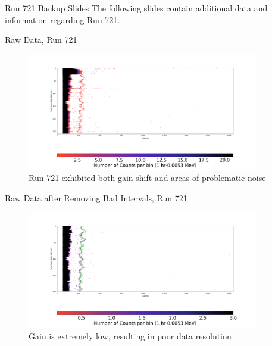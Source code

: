 \documentclass[aspectratio=169]{beamer}
\begin{document}
\begin{frame}{Run 721 Backup Slides}
\label{721_Backup}
    The following slides contain additional data and information regarding Run 721.
\end{frame}

\begin{frame}{Raw Data, Run 721}
    \begin{figure}
        \begin{center}
            \includegraphics[width=0.9\textwidth]
            {assets/721/RD.png}
            \caption{Run 721 exhibited both gain shift and areas of problematic noise}
        \end{center}
    \end{figure}
\end{frame}

\begin{frame}{Raw Data after Removing Bad Intervals, Run 721}
    \begin{figure}
        \begin{center}
            \includegraphics[width=0.9\textwidth]
            {assets/721/RDP.png}
            \caption{Gain is extremely low, resulting in poor data resolution}
        \end{center}
    \end{figure}
\end{frame}
\end{document}
